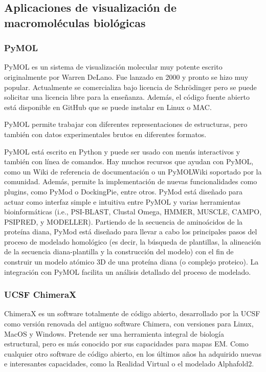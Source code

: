 \subsection{Aplicaciones de visualización de macromoléculas biológicas}
\subsubsection{PyMOL}
PyMOL es un sistema de visualización molecular muy potente escrito originalmente por Warren DeLano. Fue lanzado en 2000 y pronto se hizo muy popular. Actualmente se comercializa bajo licencia de Schrödinger pero se puede solicitar una licencia libre para la enseñanza. Además, el código fuente abierto está disponible en GitHub que se puede instalar en Linux o MAC. 

PyMOL permite trabajar con diferentes representaciones de estructuras, pero también con datos experimentales brutos en diferentes formatos.

PyMOL está escrito en Python y puede ser usado con menús interactivos y también con línea de comandos. Hay muchos recursos que ayudan con PyMOL, como un Wiki de referencia de documentación o un PyMOLWiki soportado por la comunidad. Además, permite la implementación de nuevas funcionalidades como plugins, como PyMod o DockingPie, entre otros. PyMod está diseñado para actuar como interfaz simple e intuitiva entre PyMOL y varias herramientas bioinformáticas (i.e., PSI-BLAST, Clustal Omega, HMMER, MUSCLE, CAMPO, PSIPRED, y MODELLER). Partiendo de la secuencia de aminoácidos de la proteína diana, PyMod está diseñado para llevar a cabo los principales pasos del proceso de modelado homológico (es decir, la búsqueda de plantillas, la alineación de la secuencia diana-plantilla y la construcción del modelo) con el fin de construir un modelo atómico 3D de una proteína diana (o complejo proteico). La integración con PyMOL facilita un análisis detallado del proceso de modelado.

\subsubsection{UCSF ChimeraX}
ChimeraX es un software totalmente de código abierto, desarrollado por la UCSF como versión renovada del antiguo software Chimera, con versiones para Linux, MacOS y Windows. Pretende ser una herramienta integral de biología estructural, pero es más conocido por sus capacidades para mapas EM. Como cualquier otro software de código abierto, en los últimos años ha adquirido nuevas e interesantes capacidades, como la Realidad Virtual o el modelado Alphafold2.

